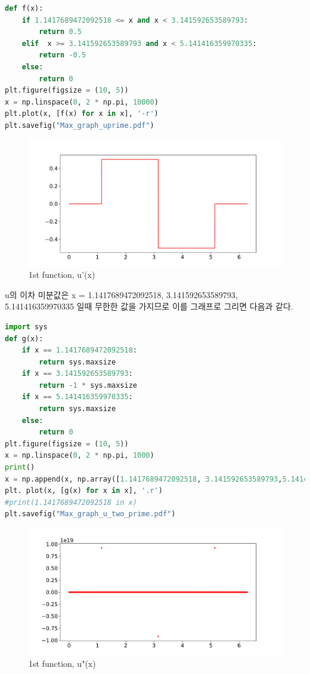 \documentclass[11pt]{article}
\begin{document}
\begin{lstlisting}[language=Python]
def f(x):
    if 1.1417689472092518 <= x and x < 3.141592653589793:
        return 0.5
    elif  x >= 3.141592653589793 and x < 5.141416359970335:
        return -0.5
    else:
        return 0
plt.figure(figsize = (10, 5))
x = np.linspace(0, 2 * np.pi, 10000)
plt.plot(x, [f(x) for x in x], '-r')
plt.savefig("Max_graph_uprime.pdf")
\end{lstlisting}

\begin{figure}[!ht]
  \centering
  \includegraphics[width=1\textwidth]{Max_graph_uprime.pdf}
  \caption{1st function, u'(x)}
\end{figure}

u의 이차 미분값은 x = 1.1417689472092518, 3.141592653589793, 5.141416359970335 일때 무한한 값을 가지므로 이를 그래프로 그리면 다음과 같다.

\begin{lstlisting}[language=Python]
import sys
def g(x):
    if x == 1.1417689472092518:
        return sys.maxsize
    if x == 3.141592653589793:
        return -1 * sys.maxsize
    if x == 5.141416359970335:
        return sys.maxsize
    else: 
        return 0
plt.figure(figsize = (10, 5))
x = np.linspace(0, 2 * np.pi, 1000)
print()
x = np.append(x, np.array([1.1417689472092518, 3.141592653589793,5.141416359970335]))
plt. plot(x, [g(x) for x in x], '.r')
#print(1.1417689472092518 in x)
plt.savefig("Max_graph_u_two_prime.pdf")
\end{lstlisting}
    
\begin{figure}[!ht]
  \centering
  \includegraphics[width=1\textwidth]{Max_graph_u_two_prime.pdf}
  \caption{1st function, u"(x)}
\end{figure}
\end{document}
